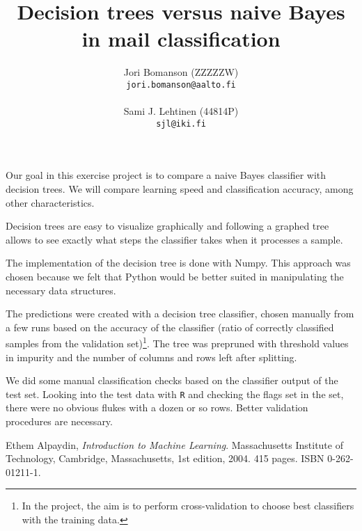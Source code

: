 \documentclass[a4paper,10pt]{article}
\title{Decision trees versus naive Bayes in mail classification}
\author{Jori Bomanson (ZZZZZW) \\
  {\tt jori.bomanson@aalto.fi} \\
  \\
  Sami J. Lehtinen (44814P)\\ 
  {\tt sjl@iki.fi} \\
}
\begin{document}

\maketitle

Our goal in this exercise project is to compare a naive Bayes classifier
with decision trees.  We will compare learning speed and classification
accuracy, among other characteristics.

Decision trees are easy to visualize graphically and following a graphed
tree allows to see exactly what steps the classifier takes when it
processes a sample.

The implementation of the decision tree is done with Numpy.  This
approach was chosen because we felt that Python would be better suited
in manipulating the necessary data structures.

The predictions were created with a decision tree classifier, chosen
manually from a few runs based on the accuracy of the classifier (ratio
of correctly classified samples from the validation set)\footnote{In the
  project, the aim is to perform cross-validation to choose best
  classifiers with the training data.}.  The tree was prepruned with
threshold values in impurity and the number of columns and rows left
after splitting.

We did some manual classification checks based on the classifier output
of the test set.  Looking into the test data with \texttt{R} and
checking the flags set in the set, there were no obvious flukes with a
dozen or so rows.  Better validation procedures are necessary.

\begin{thebibliography}{9}
  Ethem Alpaydin,
  \emph{Introduction to Machine Learning}.
  Massachusetts Institute of Technology, Cambridge, Massachusetts,
  1st edition,
  2004. 415 pages. ISBN 0-262-01211-1.
\end{thebibliography}
\end{document}
